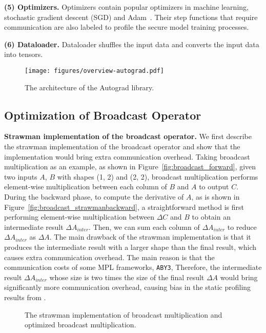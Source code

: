     \noindent  \textbf{(5) Optimizers.} Optimizers contain popular optimizers in machine learning,  stochastic gradient descent (SGD) and Adam~\cite{adam}. Their step functions that require communication are also labeled to profile the secure model training processes.
    
    \noindent \textbf{(6) Dataloader.} Dataloader shuffles the input data and converts the input data into tensors.


\begin{figure}[htbp]
    \centering
    \texttt{[image: figures/overview-autograd.pdf]}
    \caption{The architecture of the \hawkeye Autograd library.  }
    \label{fig:overview-autograd}
\end{figure}

\subsection{Optimization of Broadcast Operator}
\noindent\textbf{Strawman implementation of the broadcast operator.} We first describe the strawman implementation of the broadcast operator and show that the implementation would bring extra communication overhead. Taking broadcast multiplication as an example, as shown in Figure~\ref{fig:broadcast_forward}, given two inputs $A$, $B$ with shapes (1, 2) and (2, 2), broadcast multiplication performs element-wise multiplication between each column of $B$ and $A$ to output $C$. During the backward phase, to compute the derivative of $A$, as is shown in Figure~\ref{fig:broadcast_strawmanbackward}, a straightforward method is first performing element-wise multiplication between $\Delta C$ and $B$ to obtain an intermediate result $\Delta A_{inter}$. Then, we can sum each column of $\Delta A_{inter}$ to reduce $\Delta A_{inter}$ as $\Delta A$. The main drawback of the strawman implementation is that it produces the intermediate result with a larger shape than the final result, which causes extra communication overhead. The main reason is that the communication costs of some MPL frameworks,  \texttt{ABY3},  Therefore, the intermediate result $\Delta A_{inter}$ whose size is two times the size of the final result $\Delta A$ would bring significantly more communication overhead, causing bias in the static profiling results from \hawkeye.

\begin{figure}[htbp]
    \centering
    \hfill
    \hfill
    \caption{The strawman implementation of broadcast multiplication and optimized broadcast multiplication.}
    \label{fig:broadcast}
\end{figure}

